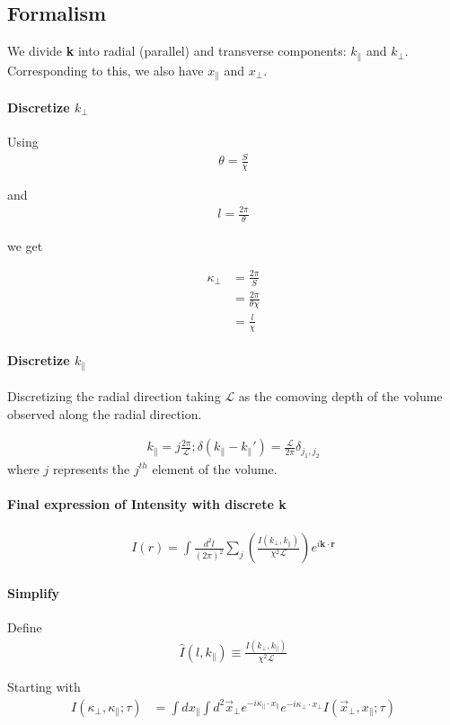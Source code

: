 \documentclass[12pt]{article}
\newcommand{\beq}{\begin{equation}}
\newcommand{\eeq}{\end{equation}}
\newcommand{\beqa}{\begin{eqnarray}}
\newcommand{\eeqa}{\end{eqnarray}}
\newcommand{\beqal}{\begin{aligned}}
\newcommand{\eeqal}{\end{aligned}}
\def\lbox{\mathcal{L}}
\numberwithin{equation}{section}
\begin{document}
\subsection{Formalism}
We divide \textbf{k} into radial (parallel) and transverse components: $ k_\parallel $ and $ k_\perp $. Corresponding to this, we also have $ x_\parallel $ and $ x_\perp $.

\paragraph{Discretize $k_\perp$} Using
\beqa
\theta = \frac{S}{\chi}
\eeqa

and 
\beqa
l = \frac{2 \pi}{\theta}
\eeqa

we get 

\beq
\beqal
\kappa_\perp &= \frac{2 \pi}{S}
\\
&= \frac{2 \pi }{\theta \chi}
\\
&= \frac{l}{\chi}
\eeqal
\eeq

\paragraph{Discretize $ k_\parallel $}Discretizing the radial direction taking $ \mathcal{L} $ as the comoving depth of the volume observed along the radial direction.

\beqa
k_\parallel  = j\frac{2\pi}{\lbox}; \delta(k_\parallel - k_\parallel') = \frac{\lbox}{2\pi} \delta_{j_1, j_2} 
\eeqa
where $ j $ represents the $ j^{th} $ element of the volume.

\paragraph{Final expression of Intensity with discrete \textbf{k}}
\beqa
I(r) = \int\frac{d^2l}{(2\pi)^2} \sum_j \left(\frac{I(k_\perp, k_\parallel)}{\chi^2 \lbox} \right) e^{i \textbf{k} \cdot \textbf{r}}
\eeqa

\paragraph{Simplify}
Define
\beqa
\hat{I} (l, k_\parallel) \equiv \frac{I(k_\perp, k_\parallel)}{\chi^2\lbox}
\eeqa

Starting with
\beq
\beqal
I(\kappa_\perp,\kappa_\parallel ; \tau) &= \int dx_\parallel \int d^2\vec{x}_\perp e^{-i \kappa_\parallel \cdot x_\parallel} e^{-i \kappa_\perp \cdot x_\perp} I(\vec{x}_\perp, x_\parallel; \tau) \label{eq:foreman1}
\eeqal
\eeq
\end{document}

